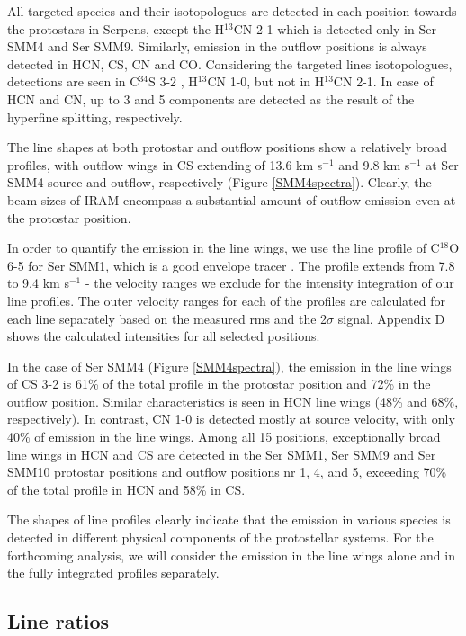 \documentclass{aa}
\begin{document}
  

All targeted species and their isotopologues are detected in each position 
towards the protostars in Serpens, except the H$^{13}$CN 2-1 which is detected only in Ser SMM4 and Ser SMM9. Similarly, emission in the outflow 
positions is always detected in HCN, CS, CN and CO. Considering the targeted lines isotopologues, detections are seen in C$^{34}$S 3-2 , H$^{13}$CN 1-0, but not in H$^{13}$CN 2-1.
In case of HCN and CN, up to 3 and 5 components are detected as the result of the hyperfine splitting, respectively. 

The line shapes at both protostar and outflow positions show a relatively broad profiles, 
with outflow wings in CS extending of 13.6 km s$^{-1}$ and 9.8 km s$^{-1}$ at Ser SMM4 
source and outflow, respectively (Figure \ref{SMM4spectra}). Clearly, the beam sizes of 
IRAM encompass a substantial amount of outflow emission even at the protostar position. 

In order to quantify the emission in the line wings, we use the line profile of C$^{18}$O 6-5
for Ser SMM1, which is a good envelope tracer \citep{Arc06}. The profile extends from 
7.8 to 9.4 km s$^{-1}$ - the velocity ranges we exclude for the intensity integration of our line profiles. The outer velocity ranges for each of the profiles are calculated 
for each line separately based on the measured rms and the 2$\sigma$ signal. Appendix D shows the calculated intensities for all selected positions.

In the case of Ser SMM4 (Figure \ref{SMM4spectra}), the emission in the line wings
of CS 3-2 is 61\% of the total profile 
in the protostar position and 72\% in the outflow position. Similar characteristics is 
seen in HCN line wings (48\% and 68\%, respectively). In contrast, CN 1-0 is detected 
mostly at source velocity, with only 40\% of emission in the line wings. Among all 15
positions, exceptionally broad line wings in HCN and CS are detected in 
the Ser SMM1, Ser SMM9 and Ser SMM10 protostar positions and outflow positions 
nr 1, 4, and 5, exceeding 70\% of the total profile in HCN and 58\% in CS.

The shapes of line profiles clearly indicate that the emission in various species is 
detected in different physical components of the protostellar systems. For the
forthcoming analysis, we will consider the emission in the line wings alone and in 
the fully integrated profiles separately.

\subsection{Line ratios}
\label{subsection:ratios}
\end{document}
